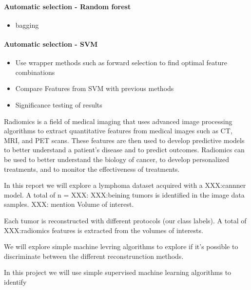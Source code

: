\paragraph{Automatic selection - Random forest} 
\begin{itemize}
    \item bagging
\end{itemize}

\paragraph{Automatic selection - SVM} 
\begin{itemize}
    \item Use wrapper methods such as forward selection to find optimal feature
        combinations
    \item Compare Features from SVM with previous methods
    \item Significance testing of results
\end{itemize}


Radiomics is a field of medical imaging that uses advanced
image processing algorithms to extract quantitative features from medical
images such as CT, MRI, and PET scans. These features are then used to develop
predictive models to better understand a patient's disease and to predict
outcomes. Radiomics can be used to better understand the biology of cancer, to
develop personalized treatments, and to monitor the effectiveness of
treatments.




In this report we will explore a lymphoma dataset acquired with a XXX:cannner
model. A total of n = XXX: XXX:beining tumors is identified in the image data
samples. XXX: mention Volume of interest.

Each tumor is reconstructed with different protocols (our class
labels). A total of XXX:radiomics features is extracted from the volumes of
interests. 

We will explore simple machine levring algorithms to explore if it's possible
to discriminate between the different reconstrunction methods.   








In this project we will use simple supervised machine learning algorithms to
identify  





